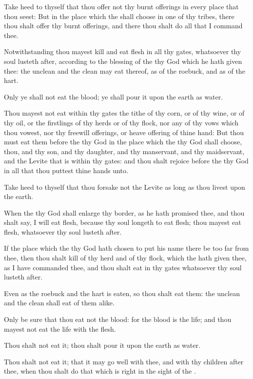 \verse Take heed to thyself that thou offer not thy burnt offerings in every place that thou seest: \verse But in the place which the \LORD shall choose in one of thy tribes, there thou shalt offer thy burnt offerings, and there thou shalt do all that I command thee.

\verse Notwithstanding thou mayest kill and eat flesh in all thy gates, whatsoever thy soul lusteth after, according to the blessing of the \LORD thy God which he hath given thee: the unclean and the clean may eat thereof, as of the roebuck, and as of the hart.

\verse Only ye shall not eat the blood; ye shall pour it upon the earth as water.

\verse Thou mayest not eat within thy gates the tithe of thy corn, or of thy wine, or of thy oil, or the firstlings of thy herds or of thy flock, nor any of thy vows which thou vowest, nor thy freewill offerings, or heave offering of thine hand: \verse But thou must eat them before the \LORD thy God in the place which the \LORD thy God shall choose, thou, and thy son, and thy daughter, and thy manservant, and thy maidservant, and the Levite that is within thy gates: and thou shalt rejoice before the \LORD thy God in all that thou puttest thine hands unto.

\verse Take heed to thyself that thou forsake not the Levite as long as thou livest upon the earth.

\verse When the \LORD thy God shall enlarge thy border, as he hath promised thee, and thou shalt say, I will eat flesh, because thy soul longeth to eat flesh; thou mayest eat flesh, whatsoever thy soul lusteth after.

\verse If the place which the \LORD thy God hath chosen to put his name there be too far from thee, then thou shalt kill of thy herd and of thy flock, which the \LORD hath given thee, as I have commanded thee, and thou shalt eat in thy gates whatsoever thy soul lusteth after.

\verse Even as the roebuck and the hart is eaten, so thou shalt eat them: the unclean and the clean shall eat of them alike.

\verse Only be sure that thou eat not the blood: for the blood is the life; and thou mayest not eat the life with the flesh.

\verse Thou shalt not eat it; thou shalt pour it upon the earth as water.

\verse Thou shalt not eat it; that it may go well with thee, and with thy children after thee, when thou shalt do that which is right in the sight of the \LORD.

